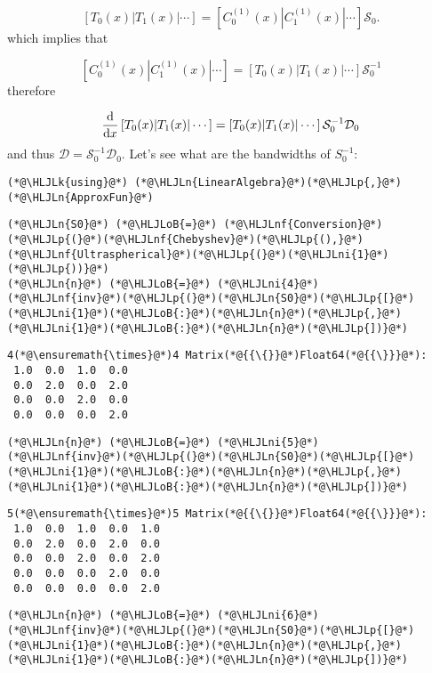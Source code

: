 \documentclass[12pt,a4paper]{article}
\newcommand{\HLJLk}[1]{\textcolor[RGB]{148,91,176}{\textbf{#1}}}
\newcommand{\HLJLn}[1]{#1}
\newcommand{\HLJLnf}[1]{\textcolor[RGB]{66,102,213}{#1}}
\newcommand{\HLJLni}[1]{\textcolor[RGB]{59,151,46}{#1}}
\newcommand{\HLJLoB}[1]{\textcolor[RGB]{102,102,102}{\textbf{#1}}}
\newcommand{\HLJLp}[1]{#1}
\begin{document}
\[
\left[T_0(x) | T_1(x) | \cdots  \right] =\left[C^{(1)}_0(x) | C^{(1)}_1(x) | \cdots  \right] \mathcal{S}_0.
\]
which implies that

\[
\left[C^{(1)}_0(x) | C^{(1)}_1(x) | \cdots  \right] = \left[T_0(x) | T_1(x) | \cdots  \right] \mathcal{S}_0^{-1}
\]
therefore

\[
\frac{{\rm d}}{{\rm d}x}\left[T_0(x) | T_1(x) | \cdots    \right] =  \left[T_0(x) | T_1(x) | \cdots  \right] \mathcal{S}_0^{-1}\mathcal{D}_0
\]
and thus $\mathcal{D} = \mathcal{S}_0^{-1}\mathcal{D}_0$.  Let's see what are the bandwidths of $S_0^{-1}$:


\begin{lstlisting}
(*@\HLJLk{using}@*) (*@\HLJLn{LinearAlgebra}@*)(*@\HLJLp{,}@*) (*@\HLJLn{ApproxFun}@*)
\end{lstlisting}


\begin{lstlisting}
(*@\HLJLn{S0}@*) (*@\HLJLoB{=}@*) (*@\HLJLnf{Conversion}@*)(*@\HLJLp{(}@*)(*@\HLJLnf{Chebyshev}@*)(*@\HLJLp{(),}@*)(*@\HLJLnf{Ultraspherical}@*)(*@\HLJLp{(}@*)(*@\HLJLni{1}@*)(*@\HLJLp{))}@*)
(*@\HLJLn{n}@*) (*@\HLJLoB{=}@*) (*@\HLJLni{4}@*)
(*@\HLJLnf{inv}@*)(*@\HLJLp{(}@*)(*@\HLJLn{S0}@*)(*@\HLJLp{[}@*)(*@\HLJLni{1}@*)(*@\HLJLoB{:}@*)(*@\HLJLn{n}@*)(*@\HLJLp{,}@*)(*@\HLJLni{1}@*)(*@\HLJLoB{:}@*)(*@\HLJLn{n}@*)(*@\HLJLp{])}@*)
\end{lstlisting}

\begin{lstlisting}
4(*@\ensuremath{\times}@*)4 Matrix(*@{{\{}}@*)Float64(*@{{\}}}@*):
 1.0  0.0  1.0  0.0
 0.0  2.0  0.0  2.0
 0.0  0.0  2.0  0.0
 0.0  0.0  0.0  2.0
\end{lstlisting}


\begin{lstlisting}
(*@\HLJLn{n}@*) (*@\HLJLoB{=}@*) (*@\HLJLni{5}@*)
(*@\HLJLnf{inv}@*)(*@\HLJLp{(}@*)(*@\HLJLn{S0}@*)(*@\HLJLp{[}@*)(*@\HLJLni{1}@*)(*@\HLJLoB{:}@*)(*@\HLJLn{n}@*)(*@\HLJLp{,}@*)(*@\HLJLni{1}@*)(*@\HLJLoB{:}@*)(*@\HLJLn{n}@*)(*@\HLJLp{])}@*)
\end{lstlisting}

\begin{lstlisting}
5(*@\ensuremath{\times}@*)5 Matrix(*@{{\{}}@*)Float64(*@{{\}}}@*):
 1.0  0.0  1.0  0.0  1.0
 0.0  2.0  0.0  2.0  0.0
 0.0  0.0  2.0  0.0  2.0
 0.0  0.0  0.0  2.0  0.0
 0.0  0.0  0.0  0.0  2.0
\end{lstlisting}


\begin{lstlisting}
(*@\HLJLn{n}@*) (*@\HLJLoB{=}@*) (*@\HLJLni{6}@*)
(*@\HLJLnf{inv}@*)(*@\HLJLp{(}@*)(*@\HLJLn{S0}@*)(*@\HLJLp{[}@*)(*@\HLJLni{1}@*)(*@\HLJLoB{:}@*)(*@\HLJLn{n}@*)(*@\HLJLp{,}@*)(*@\HLJLni{1}@*)(*@\HLJLoB{:}@*)(*@\HLJLn{n}@*)(*@\HLJLp{])}@*)
\end{lstlisting}
\end{document}
